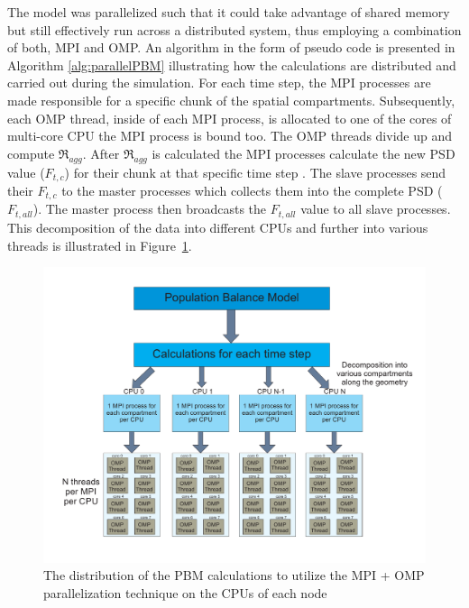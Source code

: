 \documentclass[preprint,11pt,authoryear]{elsarticle}
\begin{document}
The model was parallelized such that it
could take advantage of shared memory but still effectively run across a
distributed system, thus employing a combination of both, MPI and OMP.
An algorithm in the form of pseudo code is presented in Algorithm \ref{alg:parallelPBM} illustrating how
the calculations are distributed and carried out during the simulation. For
each time step, the MPI processes are made responsible for a specific chunk of
the spatial compartments. Subsequently, each OMP thread, inside of each MPI 
process, is allocated to one of the cores of
multi-core CPU the MPI process is bound too. The OMP threads divide up and
compute $\Re_{agg}$. After $\Re_{agg}$ is calculated the MPI processes
calculate the new PSD value ($F_{t,c}$) for their chunk at that specific time step
. The slave processes send their $F_{t,c}$ to the master processes
which collects them into the complete PSD ($F_{t,all}$). The master process then
broadcasts the $F_{t,all}$ value to all slave processes. This decomposition of
the data into different CPUs and further into various threads is illustrated
in Figure~\ref{fig:mthds_PBM_decompostion}.

\begin{figure}
\centering
\includegraphics[scale=0.45]{PBM_decomposition.pdf}
\caption{The distribution of the PBM calculations to utilize the MPI + OMP parallelization technique on the CPUs of each node}
\label{fig:mthds_PBM_decompostion}
\end{figure}
\end{document}
